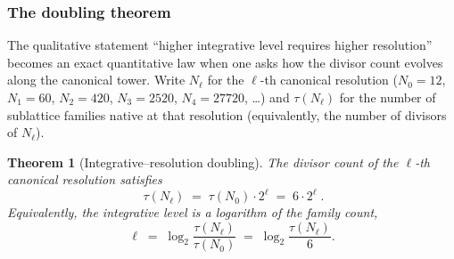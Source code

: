 \documentclass[11pt,a4paper]{article}
\newtheorem{theorem}{Theorem}[section]
\theoremstyle{definition}
\theoremstyle{remark}
\begin{document}
\subsubsection*{The doubling theorem}

The qualitative statement ``higher integrative level requires higher resolution'' becomes an exact quantitative law when one asks how the divisor count evolves along the canonical tower. Write $N_{\ell}$ for the $\ell$-th canonical resolution ($N_{0}=12$, $N_{1}=60$, $N_{2}=420$, $N_{3}=2520$, $N_{4}=27720$, \ldots) and $\tau(N_{\ell})$ for the number of sublattice families native at that resolution (equivalently, the number of divisors of $N_{\ell}$).

\begin{theorem}[Integrative--resolution doubling]\label{thm:doubling}
The divisor count of the $\ell$-th canonical resolution satisfies
\begin{equation}\label{eq:doubling}
\boxed{\;\tau(N_{\ell}) \;=\; \tau(N_{0})\cdot 2^{\ell} \;=\; 6\cdot 2^{\ell}\;.}
\end{equation}
Equivalently, the integrative level is a logarithm of the family count,
\begin{equation}\label{eq:level-log}
\ell \;=\; \log_{2}\!\frac{\tau(N_{\ell})}{\tau(N_{0})} \;=\; \log_{2}\!\frac{\tau(N_{\ell})}{6}.
\end{equation}
\end{theorem}
\end{document}
